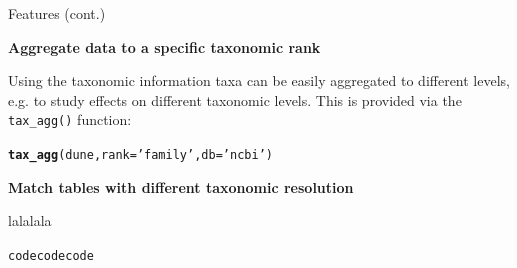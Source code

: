 \documentclass[final,t]{beamer}\usepackage[]{graphicx}\usepackage[]{color}
\makeatletter
\newcommand{\hlstr}[1]{\textcolor[rgb]{0.192,0.494,0.8}{#1}}%
\newcommand{\hlstd}[1]{\textcolor[rgb]{0.345,0.345,0.345}{#1}}%
\newcommand{\hlkwc}[1]{\textcolor[rgb]{0.333,0.667,0.333}{#1}}%
\newcommand{\hlkwd}[1]{\textcolor[rgb]{0.737,0.353,0.396}{\textbf{#1}}}%
\newenvironment{kframe}{%
 \def\at@end@of@kframe{}%
 \ifinner\ifhmode%
  \def\at@end@of@kframe{\end{minipage}}%
  \begin{minipage}{\columnwidth}%
 \fi\fi%
 \def\FrameCommand##1{\hskip\@totalleftmargin \hskip-\fboxsep
 \colorbox{shadecolor}{##1}\hskip-\fboxsep
     \hskip-\linewidth \hskip-\@totalleftmargin \hskip\columnwidth}%
 \MakeFramed {\advance\hsize-\width
   \@totalleftmargin\z@ \linewidth\hsize
   \@setminipage}}%
 {\par\unskip\endMakeFramed%
 \at@end@of@kframe}
\newenvironment{knitrout}{}{} %
\renewenvironment{knitrout}{}{\vspace{-1.8em}}
\makeatother
\begin{document}
\begin{frame}[fragile]
\begin{columns}[t]
\begin{column}{.49\linewidth}
\begin{block}{Features (cont.)}
\begin{knitrout}
{}



\end{knitrout}
\vspace{2em}

\textcolor{i6bluedark}{\textbf{\large Aggregate data to a specific taxonomic rank}}
        \vspace{0.5em}
        \par
        \begingroup
        \leftskip=2cm
        \noindent 
          Using the taxonomic information taxa can be easily aggregated to different levels, e.g. to study effects on different taxonomic levels.
          This is provided via the \texttt{tax\_agg()} function:
        \par
        \endgroup

\begin{knitrout}\footnotesize
{}\color{fgcolor}\begin{kframe}
\begin{alltt}
\hlkwd{tax_agg}\hlstd{(dune,} \hlkwc{rank} \hlstd{=} \hlstr{'family'}\hlstd{,} \hlkwc{db} \hlstd{=} \hlstr{'ncbi'}\hlstd{)}
\end{alltt}
\end{kframe}
\end{knitrout}
\vspace{2em}

\textcolor{i6bluedark}{\textbf{\large Match tables with different taxonomic resolution}}
        \vspace{0.5em}
        \par
        \begingroup
        \leftskip=2cm
        \noindent 
          lalalala
        \par
        \endgroup

\begin{knitrout}\footnotesize
{}\color{fgcolor}\begin{kframe}
\begin{alltt}
\hlstd{codecodecode}
\end{alltt}
\end{kframe}
\end{knitrout}
\vspace{2em}
      \end{block}
      

\end{column}
\end{columns}
\end{frame}
\end{document}
